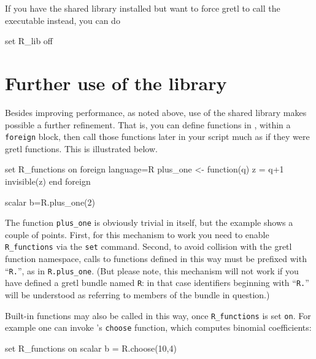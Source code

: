 If you have the  shared library installed but want to force
gretl to call the  executable instead, you can do
\begin{code}
set R_lib off
\end{code}

\section{Further use of the  library}
\label{sec:R-functions}

Besides improving performance, as noted above, use of the 
shared library makes possible a further refinement.  That is, you can
define functions in , within a \texttt{foreign} block, then
call those functions later in your script much as if they were
gretl functions.  This is illustrated below.  
%
\begin{code}
set R_functions on
foreign language=R
  plus_one <- function(q) {
     z = q+1
     invisible(z)
  }
end foreign

scalar b=R.plus_one(2)
\end{code}
%
The  function \verb|plus_one| is obviously trivial in itself,
but the example shows a couple of points.  First, for this mechanism
to work you need to enable \verb|R_functions| via the \texttt{set}
command.  Second, to avoid collision with the gretl function
namespace, calls to functions defined in this way must be prefixed
with ``\texttt{R.}'', as in \verb|R.plus_one|. (But please note, this
mechanism will not work if you have defined a gretl bundle named
\texttt{R}: in that case identifiers beginning with ``\texttt{R.{}}''
will be understood as referring to members of the bundle in question.)

Built-in  functions may also be called in this way, once
\verb|R_functions| is set \texttt{on}.  For example one can invoke
's \texttt{choose} function, which computes binomial
coefficients:
%
\begin{code}
set R_functions on
scalar b = R.choose(10,4)
\end{code}

